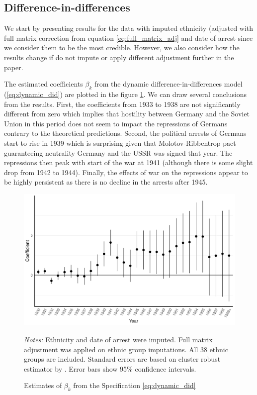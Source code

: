 \subsection{Difference-in-differences}
We start by presenting results for the data with imputed ethnicity (adjusted with full matrix correction from equation \ref{eq:full_matrix_adj} and date of arrest since we consider them to be the most credible. However, we also consider how the results change if do not impute or apply different adjustment further in the paper. 

 The estimated coefficients  $\beta_k$ from the dynamic difference-in-differences model (\ref{eq:dynamic_did}) are plotted in the figure \ref{fig:did_effets}. 
 We can draw several conclusions from the results. 
 First, the coefficients from 1933 to 1938 are not significantly different from zero which implies that hostility between Germany and the Soviet Union in this period does not seem to impact the repressions of Germans contrary to the theoretical predictions. Second, the political arrests of Germans start to rise in 1939 which is surprising given that  Molotov-Ribbentrop pact guaranteeing neutrality Germany and the USSR was signed that year. The repressions then peak  with start of the war at 1941 (although there is some slight drop from 1942 to 1944). Finally, the effects of war on the repressions appear to be highly persistent as there is no decline in the arrests after 1945. 
 
 \begin{figure}[h]
\centering
\caption{Estimates of $\beta_k$ from the Specification \ref{eq:dynamic_did}}
\includegraphics[width=\textwidth]{plots/effects/ethnicity_imputation/annual/point_range_robust_cr2_date_imp_full_years.pdf}
\begin{minipage}{0.92\textwidth}
\footnotesize
\emph{Notes:} Ethnicity and date of arrest were imputed.  Full matrix adjustment was applied on ethnic group imputations. All 38 ethnic groups are included.  Standard errors are based on cluster robust estimator by \citet{pustejovsky_small-sample_2018}. Error bars show 95\% confidence intervals. 
\end{minipage}
\label{fig:did_effets}
\end{figure}

